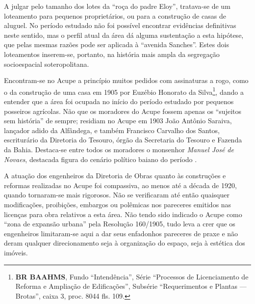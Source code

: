 A julgar pelo tamanho dos lotes da ``roça do padre Eloy'', tratava-se de um loteamento para pequenos proprietários, ou para a construção de casas de aluguel. No período estudado não foi possível encontrar evidências definitivas neste sentido, mas o perfil atual da área dá alguma sustentação a esta hipótese, que pelas mesmas razões pode ser aplicada à ``avenida Sanches''. Estes dois loteamentos inserem-se, portanto, na história mais ampla da segregação socioespacial soteropolitana.














Encontram-se no Acupe a princípio muitos pedidos com assinaturas a rogo, como o da construção de uma casa em 1905 por Euzébio Honorato da Silva\footnote{\textbf{BR BAAHMS}, Fundo ``Intendência'', Série ``Processos de Licenciamento de Reforma e Ampliação de Edificações'', Subsérie ``Requerimentos e Plantas --- Brotas'', caixa 3, proc. 8044 fls. 109.}, dando a entender que a área foi ocupada no início do período estudado por pequenos posseiros agrícolas. Não que os moradores do Acupe fossem apenas os ``sujeitos sem história'' de sempre; residiam no Acupe em 1903 João Antônio Saraiva, lançador adido da Alfândega, e também Francisco Carvalho dos Santos, escriturário da Diretoria do Tesouro, órgão da Secretaria do Tesouro e Fazenda da Bahia. Destaca-se entre todos os moradores o monsenhor \textit{Manuel José de Novaes}, destacada figura do cenário político baiano do período \cite{reis_almanak_1903}.


A atuação dos engenheiros da Diretoria de Obras quanto às construções e reformas realizadas no Acupe foi compassiva, ao menos até a década de 1920, quando tornaram-se mais rigorosos. Não se verificaram até então quaisquer modificações, proibições, embargos ou polêmicas nos pareceres emitidos nas licenças para obra relativos a esta área. Não tendo sido indicado o Acupe como ``zona de expansão urbana'' pela Resolução 160/1905, tudo leva a crer que os engenheiros limitaram-se aqui a dar seus enfadonhos pareceres de praxe e não deram qualquer direcionamento seja à organização do espaço, seja à estética dos imóveis.

